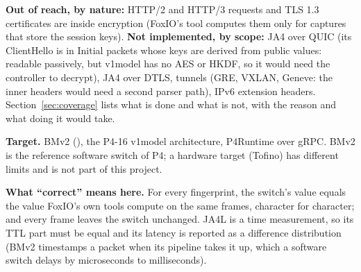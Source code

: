 \textbf{Out of reach, by nature:} HTTP/2 and HTTP/3 requests and TLS 1.3 certificates are inside encryption (FoxIO's
tool computes them only for captures that store the session keys). \textbf{Not implemented, by scope:} JA4 over QUIC
(its ClientHello is in Initial packets whose keys are derived from public values: readable passively, but v1model
has no AES or HKDF, so it would need the controller to decrypt), JA4 over DTLS, tunnels (GRE, VXLAN, Geneve: the
inner headers would need a second parser path), IPv6 extension headers. Section~\ref{sec:coverage} lists what is
done and what is not, with the reason and what doing it would take.

\textbf{Target.} BMv2 (), the P4-16 v1model architecture, P4Runtime over gRPC. BMv2 is
the reference software switch of P4; a hardware target (Tofino) has different limits and is not part of this
project.

\textbf{What ``correct'' means here.} For every fingerprint, the switch's value equals the value FoxIO's own tools
compute on the same frames, character for character; and every frame leaves the switch unchanged. JA4L is a time
measurement, so its TTL part must be equal and its latency is reported as a difference distribution (BMv2 timestamps
a packet when its pipeline takes it up, which a software switch delays by microseconds to milliseconds).
